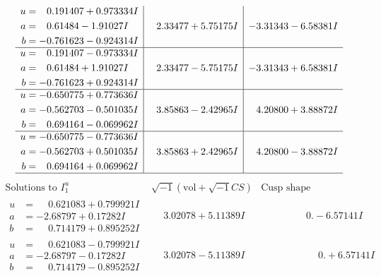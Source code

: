 \documentclass[1p]{elsarticle_modified}
\theoremstyle{definition}
\newcommand{\I}{\sqrt{-1}}
\begin{document}
$$\begin{array}{c|c|c}
\begin{aligned}
u &= \phantom{-}0.191407 + 0.973334 I \\
a &= \phantom{-}0.61484 - 1.91027 I \\
b &= -0.761623 - 0.924314 I\end{aligned}
 & \phantom{-}2.33477 + 5.75175 I & -3.31343 - 6.58381 I \\ \hline\begin{aligned}
u &= \phantom{-}0.191407 - 0.973334 I \\
a &= \phantom{-}0.61484 + 1.91027 I \\
b &= -0.761623 + 0.924314 I\end{aligned}
 & \phantom{-}2.33477 - 5.75175 I & -3.31343 + 6.58381 I \\ \hline\begin{aligned}
u &= -0.650775 + 0.773636 I \\
a &= -0.562703 - 0.501035 I \\
b &= \phantom{-}0.694164 - 0.069962 I\end{aligned}
 & \phantom{-}3.85863 - 2.42965 I & \phantom{-}4.20800 + 3.88872 I \\ \hline\begin{aligned}
u &= -0.650775 - 0.773636 I \\
a &= -0.562703 + 0.501035 I \\
b &= \phantom{-}0.694164 + 0.069962 I\end{aligned}
 & \phantom{-}3.85863 + 2.42965 I & \phantom{-}4.20800 - 3.88872 I\\
 \hline 
 \end{array}$$\newpage$$\begin{array}{c|c|c}  
\text{Solutions to }I^u_{1}& \I (\text{vol} + \sqrt{-1}CS) & \text{Cusp shape}\\
 \hline 
\begin{aligned}
u &= \phantom{-}0.621083 + 0.799921 I \\
a &= -2.68797 + 0.17282 I \\
b &= \phantom{-}0.714179 + 0.895252 I\end{aligned}
 & \phantom{-}3.02078 + 5.11389 I & \phantom{-0.000000 } 0. - 6.57141 I \\ \hline\begin{aligned}
u &= \phantom{-}0.621083 - 0.799921 I \\
a &= -2.68797 - 0.17282 I \\
b &= \phantom{-}0.714179 - 0.895252 I\end{aligned}
 & \phantom{-}3.02078 - 5.11389 I & \phantom{-0.000000 -}0. + 6.57141 I \\ \hline\begin{aligned}

\end{aligned}
\end{array}$$
\end{document}
